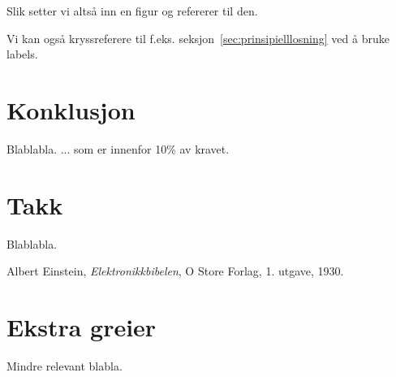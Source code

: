 \documentclass[11pt,norsk]{elsys-design}
\begin{document}
Slik setter vi altså inn en figur og refererer til den. 

Vi kan også kryssreferere til f.eks. seksjon~\ref{sec:prinsipielllosning} ved å bruke labels.



\section{Konklusjon}
\label{sec:konklusjon}

Blablabla. ... som er innenfor 10\% av kravet.

\section{Takk}
Blablabla.

{}
\begin{thebibliography}{99}

	Albert Einstein,
	\emph{Elektronikkbibelen},
	O Store Forlag,
	1. utgave,
	1930.

\end{thebibliography}

\appendix
\section{Ekstra greier}
Mindre relevant blabla.
\end{document}
